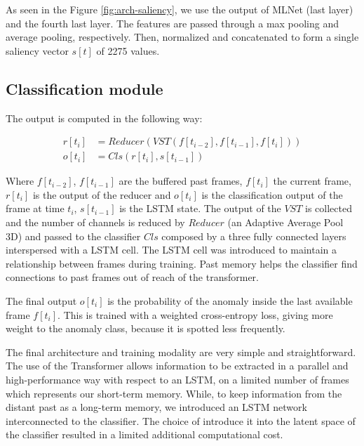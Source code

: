 As seen in the Figure \ref{fig:arch-saliency}, we use the output of MLNet (last layer) and the fourth last layer.
The features are passed through a max pooling and average pooling, respectively.
Then, normalized and concatenated to form a single saliency vector $s[t]$ of 2275 values.

\subsection{Classification module}

The output is computed in the following way:

\begin{equation}
\begin{split}
    r[t_{i}] &= Reducer(VST(f[t_{i-2}], f[t_{i-1}], f[t_{i}])) \\
    o[t_{i}] &= Cls(r[t_{i}], s[t_{i-1}])
\end{split}
\end{equation}

\noindent Where $f[t_{i-2}]$, $f[t_{i-1}]$ are the buffered past frames, $f[t_{i}]$ the current frame, $r[t_{i}]$ is the output of the reducer and $o[t_{i}]$ is the classification output of the frame at time $t_{i}$, $s[t_{i-1}]$ is the LSTM state.
The output of the $VST$ is collected and the number of channels is reduced by $Reducer$ (an Adaptive Average Pool 3D) and passed to the classifier $Cls$ composed by a three fully connected layers interspersed with a LSTM cell.
The LSTM cell was introduced to maintain a relationship between frames during training.
Past memory helps the classifier find connections to past frames out of reach of the transformer.

The final output $o[t_{i}]$ is the probability of the anomaly inside the last available frame $f[t_{i}]$.
This is trained with a weighted cross-entropy loss, giving more weight to the anomaly class, because it is spotted less frequently.

The final architecture and training modality are very simple and straightforward.
The use of the Transformer allows information to be extracted in a parallel and high-performance way with respect to an LSTM, on a limited number of frames which represents our short-term memory.
While, to keep information from the distant past as a long-term memory, we introduced an LSTM network interconnected to the classifier.
The choice of introduce it into the latent space of the classifier resulted in a limited additional computational cost.

